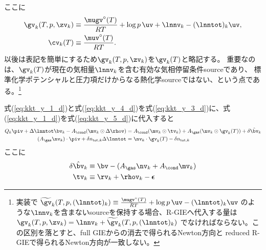 ここに
\begin{align}
    \gv_k(T,p,\zv_k)
    &\equiv
    \frac{\mugv^\circ(T)}{RT}
    + \log p\,\uv
    + \lnnv_k
    - (\lnntot)_k \uv,\\
    \cv_k (T) &\equiv \frac{\muv^\circ(T)}{RT}.
\end{align}
以後は表記を簡単にするため$\gv_k(T,p,\zv_k)$を$\gv_k(T)$と略記する。
重要なのは、$\gv_k(T)$が現在の気相量$\lnnv_k$を含む有効な気相停留条件sourceであり、
標準化学ポテンシャルと圧力項だけからなる熱化学sourceではない、という点である。\footnote{
実装で
$
    \widetilde{\gv}_k(T,p, (\lnntot)_k)
    \equiv
    \frac{\mugv^\circ(T)}{RT}
    + \log p\,\uv
    - (\lnntot)_k \uv
$
のような$\lnnv_k$を含まないsourceを保持する場合、R-GIEへ代入する量は
$
    \gv_k(T,p,\zv_k) = \lnnv_k + \widetilde{\gv}_k(T,p,(\lnntot)_k)
$
でなければならない。この区別を落とすと、full GIEからの消去で得られるNewton方向と
reduced R-GIEで得られるNewton方向が一致しない。
}

式(\ref{eq:kkt_y_1_d})と式(\ref{eq:kkt_y_4_d})を式(\ref{eq:kkt_y_3_d})に、式(\ref{eq:kkt_y_1_d})を式(\ref{eq:kkt_y_5_d})に代入すると
\begin{align}
\label{eq:kkt_z_3_d}
Q_k \piv + \Delta \lnntot \bv_k - A_\cond ( \mv_k \odot \Delta \rhov) &= A_\cond ( \mv_k \odot \tv_k ) + A_\gas ( \nv_k \odot \gv_k (T) ) + \delta \hat{\bv}_k\\
\label{eq:kkt_z_5_d}
(A_\gas \nv_k) \cdot \piv + \delta n_{\mathrm{tot}, k} \Delta \lnntot &= \nv_k \cdot \gv_k(T) - \delta n_{\mathrm{tot}, k}
 \end{align}
 ここに
\begin{align}
\delta \hat{\bv}_k &\equiv \bv - ( A_\gas \nv_k + A_\cond \mv_k) \\ 
\tv_k &\equiv \rv_k + \rhov_k - \boldsymbol{\epsilon} 
\end{align}

